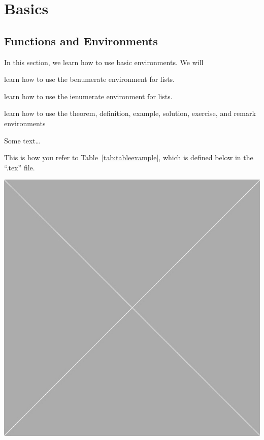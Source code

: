 \documentclass[10pt,oneside]{book}
\begin{document}
\chapter{Basics}


\section{Functions and Environments}

\begin{objectives}{In this section, we learn how to use basic environments. We will}
  \item
    learn how to use the benumerate environment for lists.
  \item
    learn how to use the ienumerate environment for lists.
  \item
    learn how to use the theorem, definition, example, solution, exercise, and remark environments
\end{objectives}


Some text\ldots

This is how you refer to Table~\ref{tab:tableexample}, which is defined below in
the ``.tex'' file.

\begin{marginfigure}
    \includegraphics[width=\linewidth]{Pictures/placeholder.jpg}
    \caption{This is a how you put a figure in the margin.}
    \label{fig:marginfig2}
\end{marginfigure}
\end{document}
